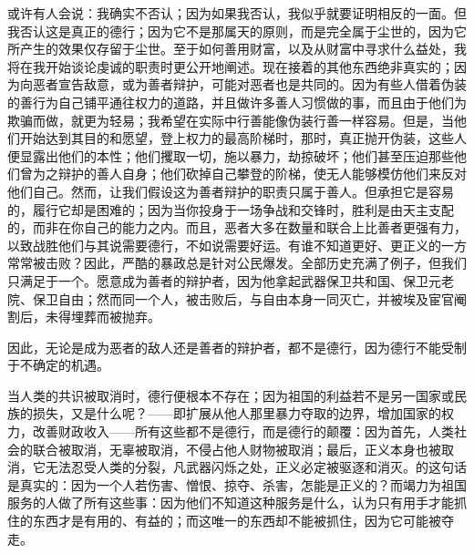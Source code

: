 或许有人会说：我确实不否认；因为如果我否认，我似乎就要证明相反的一面。但我否认这是真正的德行；因为它不是那属天的原则，而是完全属于尘世的，因为它所产生的效果仅存留于尘世。至于如何善用财富，以及从财富中寻求什么益处，我将在我开始谈论虔诚的职责时更公开地阐述。现在接着的其他东西绝非真实的；因为向恶者宣告敌意，或为善者辩护，可能对恶者也是共同的。因为有些人借着伪装的善行为自己铺平通往权力的道路，并且做许多善人习惯做的事，而且由于他们为欺骗而做，就更为轻易；我希望在实际中行善能像伪装行善一样容易。但是，当他们开始达到其目的和愿望，登上权力的最高阶梯时，那时，真正抛开伪装，这些人便显露出他们的本性；他们攫取一切，施以暴力，劫掠破坏；他们甚至压迫那些他们曾为之辩护的善人自身；他们砍掉自己攀登的阶梯，使无人能够模仿他们来反对他们自己。然而，让我们假设这为善者辩护的职责只属于善人。但承担它是容易的，履行它却是困难的；因为当你投身于一场争战和交锋时，胜利是由天主支配的，而非在你自己的能力之内。而且，恶者大多在数量和联合上比善者更强有力，以致战胜他们与其说需要德行，不如说需要好运。有谁不知道更好、更正义的一方常常被击败？因此，严酷的暴政总是针对公民爆发。全部历史充满了例子，但我们只满足于一个。愿意成为善者的辩护者，因为他拿起武器保卫共和国、保卫元老院、保卫自由；然而同一个人，被击败后，与自由本身一同灭亡，并被埃及宦官阉割后，未得埋葬而被抛弃。\par

因此，无论是成为恶者的敌人还是善者的辩护者，都不是德行，因为德行不能受制于不确定的机遇。\par

\par

当人类的共识被取消时，德行便根本不存在；因为祖国的利益若不是另一国家或民族的损失，又是什么呢？——即扩展从他人那里暴力夺取的边界，增加国家的权力，改善财政收入——所有这些都不是德行，而是德行的颠覆：因为首先，人类社会的联合被取消，无辜被取消，不侵占他人财物被取消；最后，正义本身也被取消，它无法忍受人类的分裂，凡武器闪烁之处，正义必定被驱逐和消灭。的这句话是真实的：因为一个人若伤害、憎恨、掠夺、杀害，怎能是正义的？而竭力为祖国服务的人做了所有这些事：因为他们不知道这种服务是什么，认为只有用手才能抓住的东西才是有用的、有益的；而这唯一的东西却不能被抓住，因为它可能被夺走。\par


